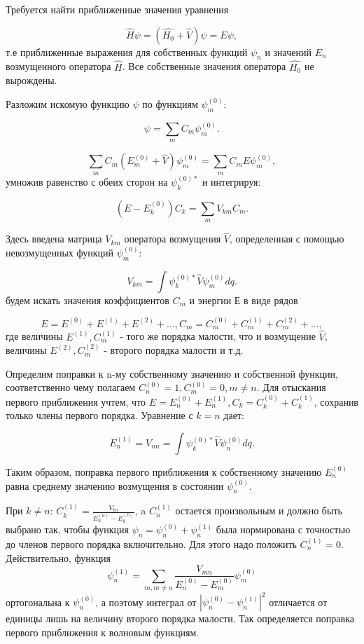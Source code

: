 Требуется найти приближенные значения уравнения

$$\widehat{H}\psi=(\widehat{H_0}+\widehat{V})\psi=E\psi,$$
т.е приближенные выражения для собственных функций $\psi_n$ и значений $E_n$ возмущенного оператора $\widehat{H}$. Все собственные значения оператора $\widehat{H_0}$ не вырождены.

Разложим искомую функцию $\psi$ по функциям $\psi^{(0)}_m$:

$$\psi=\sum_m C_m \psi^{(0)}_m.$$

$$\sum_m C_m(E_m^{(0)}+\widehat{V})\psi_m^{(0)}=\sum_m C_mE\psi_m^{(0)},$$
умножив равенство с обеих сторон на $\psi_k^{(0)*}$ и интегрируя:

$$(E-E_k^{(0)})C_k=\sum_m V_{km}C_m.$$

Здесь введена матрица $V_{km}$ оператора возмущения $\widehat{V}$, определенная с помощью невозмущенных функций $\psi_m^{(0)}$:

$$V_{km}=\int \psi_k^{(0)*} \widehat{V} \psi_m^{(0)} dq.$$
будем искать значения коэффициентов $C_m$ и энергии Е в виде рядов

$$E=E^{(0)}+E^{(1)}+E^{(2)}+..., C_m=C_m^{(0)}+C_m^{(1)}+C_m^{(2)}+...,$$
где величины $E^{(1)}, C_m^{(1)}$ - того же порядка малости, что и возмущение $\widehat{V}$, величины $E^{(2)}, C_m^{(2)}$ - второго порядка малости и т.д. 

Определим поправки к n-му собственному значению и собственной функции, соответственно чему полагаем $C_n^{(0)}=1, C_m^{(0)}=0, m\neq n$. Для отыскания первого приближения учтем, что $E=E_n^{(0)}+E_n^{(1)}, C_k=C_k^{(0)}+C_k^{(1)}$, сохранив только члены первого порядка. Уравнение с $k=n$ дает:

$$E_n^{(1)}=V_{nn}=\int \psi_k^{(0)*} \widehat{V} \psi_n^{(0)} dq.$$

Таким образом, поправка первого приближения к собственному значению $E_n^{(0)}$ равна среднему значению возмущения в состоянии $\psi_n^{(0)}$. 

При $k\neq n$: $C_k^{(1)}=\frac{V_{kn}}{E_n^{(0)}-E_k^{(0)}}$, a $C_n^{(1)}$ остается произвольным и должно быть выбрано так, чтобы функция $\psi_n=\psi_n^{(0)}+\psi_n^{(1)}$ была нормирована с точностью до членов первого порядка включительно. Для этого надо положить $C_n^{(1)}=0$. Действительно, функция
$$\psi_n^{(1)}=\sum_{m,m\neq n} \frac{V_{mn}}{E_n^{(0)}-E_m^{(0)}}\psi_m^{(0)}$$
ортогональна к $\psi_n^{(0)}$, а поэтому интеграл от $|\psi_n^{(0)}-\psi_n^{(1)}|^2$ отличается от единицы лишь на величину второго порядка малости. Так определяется поправка первого приближения к волновым функциям.

